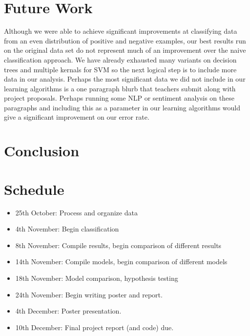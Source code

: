 \documentclass{article}
\begin{document}
\section{Future Work}
Although we were able to achieve significant improvements at classifying data from an even distribution of positive and negative examples, our best results run on the original data set do not represent much of an improvement over the naive classification approach. We have already exhausted many variants on decision trees and multiple kernals for SVM so the next logical step is to include more data in our analysis. Perhaps the most significant data we did not include in our learning algorithms is a one paragraph blurb that teachers submit along with project proposals. Perhaps running some NLP or sentiment analysis on these paragraphs and including this as a parameter in our learning algorithms would give a significant improvement on our error rate.

\section{Conclusion}

\newpage
\section{Schedule}

\begin{itemize}
\item 25th October: Process and organize data
\item 4th November: Begin classification
\item 8th November: Compile results, begin comparison of different results
\item 14th November: Compile models, begin comparison of different models
\item 18th November: Model comparison, hypothesis testing
\item 24th November: Begin writing poster and report.
\item 4th December: Poster presentation.
\item 10th December: Final project report (and code) due.
\end{itemize}
\end{document}
